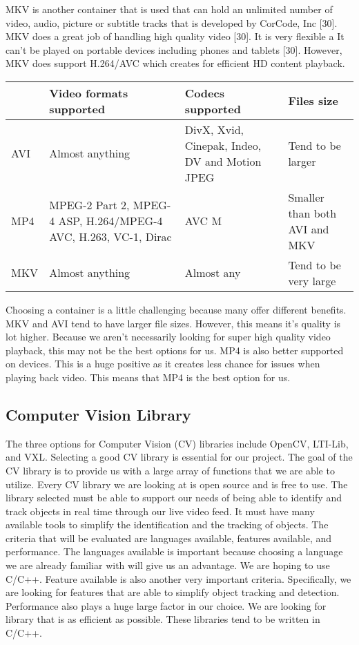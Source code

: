\documentclass[letterpaper,10pt,onecolumn,draftclsnofoot]{IEEEtran}
\begin{document}
MKV is another container that is used that can hold an unlimited number of video, audio, picture or subtitle tracks  that is developed by CorCode, Inc [30].
MKV does a great job of handling high quality video [30].
It is very flexible a
It can't be played on portable devices including phones and tablets [30].
However, MKV does support H.264/AVC which creates for efficient HD content playback.

\begin{center}
	\begin{tabular}{|p{2cm}|p{5cm}|p{4cm}|p{4cm}|}
		
		\hline
		\textbf{} & \textbf{Video formats supported} & \textbf{Codecs supported} & \textbf{Files size} \\
		\hline
		AVI & Almost anything & DivX, Xvid, Cinepak, Indeo, DV and Motion JPEG & Tend to be larger \\
		\hline
		MP4 & MPEG-2 Part 2, MPEG-4 ASP, H.264/MPEG-4 AVC, H.263, VC-1, Dirac & AVC M & Smaller than both AVI and MKV \\
		\hline
		MKV & Almost anything & Almost any & Tend to be very large \\
		\hline
		
	\end{tabular}
\end{center}

Choosing a container is a little challenging because many offer different benefits.
MKV and AVI tend to have larger file sizes.
However, this means it's quality is lot higher.
Because we aren't necessarily looking for super high quality video playback, this may not be the best options for us.
MP4 is also better supported on devices.
This is a huge positive as it creates less chance for issues when playing back video.
This means that MP4 is the best option for us.


\newpage
\subsection{Computer Vision Library} %
The three options for Computer Vision (CV) libraries include OpenCV, LTI-Lib, and VXL.
Selecting a good CV library is essential for our project.
The goal of the CV library is to provide us with a large array of functions that we are able to utilize.
Every CV library we are looking at is open source and is free to use.
The library selected must be able to support our needs of being able to identify and track objects in real time through our live video feed.
It must have many available tools to simplify the identification and the tracking of objects.
The criteria that will be evaluated are languages available, features available, and performance.
The languages available is important because choosing a language we are already familiar with will give us an advantage.
We are hoping to use C/C++.
Feature available is also another very important criteria.
Specifically, we are looking for features that are able to simplify object tracking and detection.
Performance also plays a huge large factor in our choice.
We are looking for library that is as efficient as possible.
These libraries tend to be written in C/C++.
\end{document}

